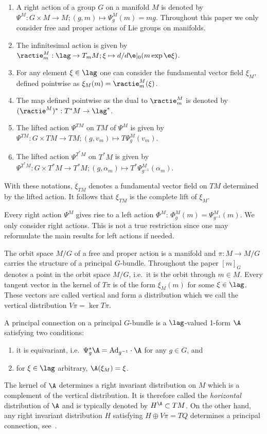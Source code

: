 \begin{definition} \label{def:acties}\mbox{}
\begin{enumerate}\itemsep=0pt
\item A right action of a group $G$ on a manifold $M$ is denoted by $\Psi^M: G\times M\to M; (g,m)\mapsto \Psi^M_g(m)= mg$. Throughout this paper we only consider free and proper actions of Lie groups on manifolds.
\item  The inf\/initesimal action is given by  $\ractie^M_m:\lag\to T_mM; \xi \mapsto d/d\e|_0 (m\exp \e\xi)$.
\item For any element $\xi \in \lag$ one can consider the fundamental vector f\/ield $\xi_M$, def\/ined pointwise as $\xi_M(m) = \ractie^M_m(\xi)$.
\item The map def\/ined pointwise as the dual to $\ractie^M_m$ is denoted by $(\ractie^M)^*: T^*M \to \lag^*$.
\item The lifted action $\Psi^{TM}$ on $TM$ of $\Psi^M$ is given by $\Psi^{TM}: G\times TM \to TM; (g,v_m) \mapsto T\Psi^M_g(v_m)$.
\item The lifted action $\Psi^{T^*M}$ on $T^*M$ is given by $\Psi^{T^*M}: G\times T^*M \to T^*M; (g,\alpha_m) \mapsto T^*\Psi^M_{g^{-1}}(\alpha_m)$.
\end{enumerate}
\end{definition}
With these notations, $\xi_{TM}$ denotes a fundamental vector f\/ield on $TM$ determined by the lifted action. It follows that $\xi_{TM}$ is the complete lift of $\xi_M$.

Every right action $\Psi^M$ gives rise to a left action $\Phi^M$: $\Phi^M_{g}(m) = \Psi^M_{g^{-1}}(m)$. We only consider right actions. This is not a true restriction since one may reformulate the main results for left actions if needed.

The orbit space $M/G$ of a free and proper action is a manifold and $\pi:M\to M/G$ carries the structure of a principal $G$-bundle. Throughout the paper $[m]_G$ denotes a point in the orbit space $M/G$, i.e.\ it is the orbit through $m\in M$.  Every tangent vector in the kernel of $T\pi$ is of the form $\xi_M(m)$ for some $\xi\in\lag$. These vectors are called vertical and form a distribution which we call the vertical distribution $V\pi=\ker T\pi$.

\begin{definition} A principal connection on a principal $G$-bundle is a $\lag$-valued 1-form $\A$ satisfying two conditions:
\begin{enumerate}\itemsep=0pt
\item[1)] it is equivariant, i.e.\ $\Psi^*_g\A = {\rm Ad}_{g^{-1}} \cdot \A$ for any $g\in G$, and
\item[2)] for $\xi\in\lag$ arbitrary, $\A ( \xi_M)=\xi$.\end{enumerate} \end{definition}
The kernel of $\A$ determines a right invariant distribution on $M$ which is a complement of the vertical distribution. It is therefore called the {\em horizontal} distribution of $\A$ and is typically denoted by $H^{\A}\subset TM$. On the other hand, any right invariant distribution $H$ satisfying $H\oplus V\pi = TQ$ determines a principal connection, see~\cite{koba}.

